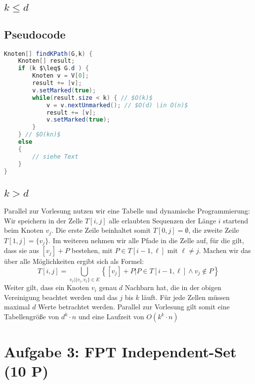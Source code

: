 \documentclass[a4paper,11pt,twoside]{scrartcl}
\begin{document}
\subsection{$k \leq d$ }
\subsection{Pseudocode}
\begin{lstlisting}[language=Java]
Knoten[] findKPath(G,k) {
	Knoten[] result;
	if (k $\leq$ G.d ) {
		Knoten v = V[0];
		result += [v];
		v.setMarked(true);
		while(result.size < k) { // $O(k)$
			v = v.nextUnmarked(); // $O(d) \in O(n)$
			result += [v];
			v.setMarked(true);
		}
	} // $O(kn)$
	else 
	{
		// siehe Text
	}
}
\end{lstlisting}
\subsection{$k > d$}
Parallel zur Vorlesung nutzen wir eine Tabelle und dynamische Programmierung:\\
Wir speichern in der Zelle $T[i,j]$ alle erlaubten Sequenzen der Länge $i$ startend beim Knoten $v_j$. Die erste Zeile beinhaltet somit $T[0,j] = \emptyset$, die zweite Zeile $T[1,j] = \{ v_j \}$. Im weiteren nehmen wir alle Pfade in die Zelle auf, für die gilt, dass sie aus $[v_j] + P$ bestehen, mit $P \in T[i-1,\ell]$ mit $\ell \neq j$. Machen wir das über alle Möglichkeiten ergibt sich als Formel:
\[ T[i,j] = \bigcup_{v_\ell | \{v_i,v_\ell\} \in E } \left\{ [v_j] + P | P \in T[i-1, \ell] \land v_j \notin P \right\} \]
Weiter gilt, dass ein Knoten $v_i$ genau $d$ Nachbarn hat, die in der obigen Vereinigung beachtet werden und das $j$ bis $k$ läuft. Für jede Zellen müssen maximal $d$ Werte betrachtet werden. Parallel zur Vorlesung gilt somit eine Tabellengröße von $d^k \cdot n$ und eine Laufzeit von $O(k^k \cdot n)$
\section{Aufgabe 3: FPT Independent-Set (10 P)}
\end{document}
